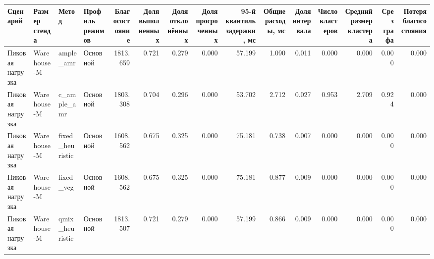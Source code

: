 \begin{tabular}{llllrrrrrrrrrrr}
\toprule
 Сценарий & Размер стенда & Метод & Профиль режимов & Благосостояние & Доля выполненных & Доля отклонённых & Доля просроченных & 95-й квантиль задержки, мс & Общие расходы, мс & Доля интервала & Число кластеров & Средний размер кластера & Срез графа & Потеря благосостояния \\
\midrule
 Пиковая нагрузка & Warehouse-M & ample_amr & Основной & 1813.659 & 0.721 & 0.279 & 0.000 & 57.199 & 1.090 & 0.011 & 0.000 & 0.000 & 0.000 & 0.000 \\
 Пиковая нагрузка & Warehouse-M & c_ample_amr & Основной & 1803.308 & 0.704 & 0.296 & 0.000 & 53.702 & 2.712 & 0.027 & 0.953 & 2.709 & 0.924 & 0.000 \\
 Пиковая нагрузка & Warehouse-M & fixed_heuristic & Основной & 1608.562 & 0.675 & 0.325 & 0.000 & 75.181 & 0.738 & 0.007 & 0.000 & 0.000 & 0.000 & 0.000 \\
 Пиковая нагрузка & Warehouse-M & fixed_vcg & Основной & 1608.562 & 0.675 & 0.325 & 0.000 & 75.181 & 0.877 & 0.009 & 0.000 & 0.000 & 0.000 & 0.000 \\
 Пиковая нагрузка & Warehouse-M & qmix_heuristic & Основной & 1813.507 & 0.721 & 0.279 & 0.000 & 57.199 & 0.866 & 0.009 & 0.000 & 0.000 & 0.000 & 0.000 \\
\bottomrule
\end{tabular}
